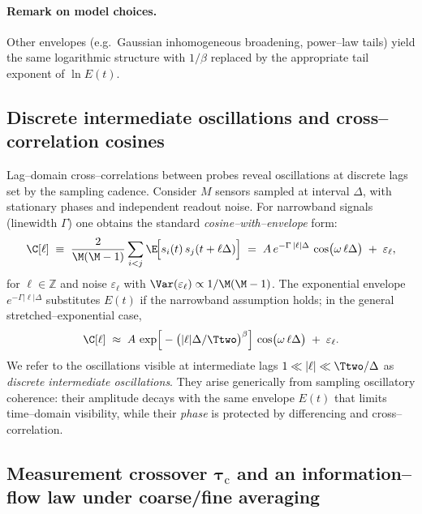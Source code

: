 \documentclass[12pt,a4paper]{article}
\theoremstyle{definition}
\theoremstyle{remark}
\begin{document}
\paragraph{Remark on model choices.}
Other envelopes (e.g.\ Gaussian inhomogeneous broadening, power--law tails) yield the same logarithmic structure with \(1/\beta\) replaced by the appropriate tail exponent of \(\ln E(t)\).

\subsection{Discrete intermediate oscillations and cross--correlation cosines}
\label{sec:8.2}

Lag--domain cross--correlations between probes reveal oscillations at discrete lags set by the sampling cadence. Consider \(M\) sensors sampled at interval \(\Delta\), with stationary phases and independent readout noise. For narrowband signals (linewidth \(\Gamma\)) one obtains the standard \emph{cosine--with--envelope} form:
\begin{equation}
\C[\ell]
\;\equiv\;
\frac{2}{\M(\M-1)}\sum_{i<j}\E\!\Big[s_i(t)\,s_j(t+\ell\Delta)\Big]
\;=\; A\,e^{-\Gamma\,|\ell|\Delta}\,\cos\!\big(\omega\,\ell\Delta\big)\;+\;\varepsilon_\ell,
\label{eq:lag-cos}
\end{equation}
for \(\ell\in\mathbb{Z}\) and noise \(\varepsilon_\ell\) with \(\Var(\varepsilon_\ell)\propto 1/\M(\M-1)\). The exponential envelope \(e^{-\Gamma|\ell|\Delta}\) substitutes \(E(t)\) if the narrowband assumption holds; in the general stretched--exponential case,
\begin{equation}
\C[\ell]
\;\approx\;
A\,\exp\!\Big[-\big(|\ell|\Delta/\Ttwo\big)^{\beta}\Big]\,
\cos\!\big(\omega\,\ell\Delta\big)
\;+\;\varepsilon_\ell.
\label{eq:lag-cos-stretched}
\end{equation}
We refer to the oscillations visible at intermediate lags \(1\ll |\ell|\ll \Ttwo/\Delta\) as \emph{discrete intermediate oscillations}. They arise generically from sampling oscillatory coherence: their amplitude decays with the same envelope \(E(t)\) that limits time--domain visibility, while their \emph{phase} is protected by differencing and cross--correlation.

\subsection{Measurement crossover \(\bm{\tau_{\mathrm{c}}}\) and an information--flow law under coarse/fine averaging}
\label{sec:8.3}
\end{document}
